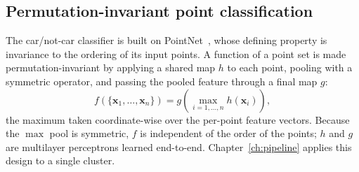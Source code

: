 \subsection{Permutation-invariant point classification}
\label{sec:th-pointnet}
The car/not-car classifier is built on PointNet~\cite{Qi_2017_CVPR}, whose defining property
is invariance to the ordering of its input points. A function of a point set is made
permutation-invariant by applying a shared map $h$ to each point, pooling with a symmetric
operator, and passing the pooled feature through a final map $g$:
\begin{equation}
  f(\{\mathbf{x}_1,\dots,\mathbf{x}_n\}) = g\!\left( \max_{i=1,\dots,n} h(\mathbf{x}_i) \right),
\end{equation}
the maximum taken coordinate-wise over the per-point feature vectors. Because the $\max$ pool
is symmetric, $f$ is independent of the order of the points; $h$ and $g$ are multilayer
perceptrons learned end-to-end. Chapter~\ref{ch:pipeline} applies this design to a single
cluster.

